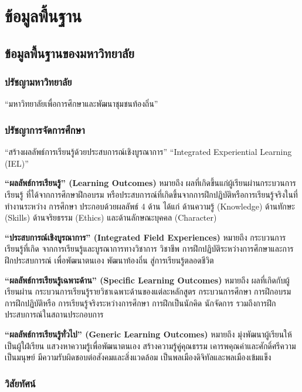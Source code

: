 \section{ข้อมูลพื้นฐาน} \label{sec:basic_info}

\subsection{ข้อมูลพื้นฐานของมหาวิทยาลัย}

\subsubsection*{ปรัชญามหาวิทยาลัย}

``มหาวิทยาลัยเพื่อการศึกษาและพัฒนาชุมชนท้องถิ่น''

\subsubsection*{ปรัชญาการจัดการศึกษา}

``สร้างผลลัพธ์การเรียนรู้ด้วยประสบการณ์เชิงบูรณาการ'' ``Integrated Experiential Learning (IEL)''

\textbf{``ผลลัพธ์การเรียนรู้'' (Learning Outcomes)} หมายถึง ผลที่เกิดขึ้นแก่ผู้เรียนผ่านกระบวนการเรียนรู้
ที่ได้จากการศึกษาฝึกอบรม หรือประสบการณ์ที่เกิดขึ้นจากการฝึกปฏิบัติหรือการเรียนรู้จริงในที่ทำงานระหว่าง
การศึกษา ประกอบด้วยผลลัพธ์ 4 ด้าน ได้แก่ ด้านความรู้ (Knowledge) ด้านทักษะ (Skills)
ด้านจริยธรรม (Ethics) และด้านลักษณะบุคคล (Character)

\textbf{``ประสบการณ์เชิงบูรณาการ'' (Integrated Field Experiences)} หมายถึง กระบวนการเรียนรู้ที่เกิด
จากการเรียนรู้และบูรณาการทางวิชาการ วิชาชีพ การฝึกปฏิบัติระหว่างการศึกษาและการฝึกประสบการณ์
เพื่อพัฒนาตนเอง พัฒนาท้องถิ่น สู่การเรียนรู้ตลอดชีวิต

\textbf{``ผลลัพธ์การเรียนรู้เฉพาะด้าน'' (Specific Learning Outcomes)} หมายถึง ผลที่เกิดกับผู้เรียนผ่าน
กระบวนการเรียนรู้รายวิชาเฉพาะด้านของแต่ละหลักสูตร กระบวนการศึกษา การฝึกอบรม การฝึกปฏิบัติหรือ
การเรียนรู้จริงระหว่างการศึกษา การฝึกเป็นนักคิด นักจัดการ รวมถึงการฝึกประสบการณ์ในสถานประกอบการ

\textbf{``ผลลัพธ์การเรียนรู้ทั่วไป'' (Generic Learning Outcomes)} หมายถึง มุ่งพัฒนาผู้เรียนให้เป็นผู้ใฝ่เรียน
แสวงหาความรู้เพื่อพัฒนาตนเอง สร้างความรู้คู่คุณธรรม เคารพคุณค่าและศักดิ์ศรีความเป็นมนุษย์
มีความรับผิดชอบต่อสังคมและสิ่งแวดล้อม เป็นพลเมืองดิจิทัลและพลเมืองเข้มแข็ง

\subsubsection*{วิสัยทัศน์}


